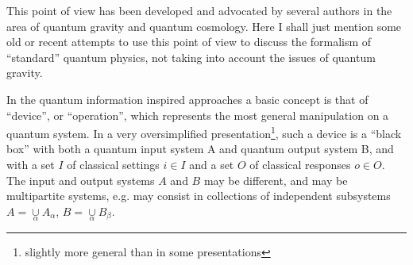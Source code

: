 This point of view has been developed and advocated by several authors in the area of quantum gravity and quantum cosmology. 
Here I shall just mention some old or recent attempts to use this point of view to discuss the formalism of ``standard'' quantum physics, not taking into account the issues of quantum gravity.

In the quantum information inspired approaches a basic concept is that of %
``device'', or ``operation'', which represents the most general manipulation on a quantum system. In a very oversimplified presentation\footnote{slightly more general than in some presentations}, such a device  is a ``black box'' with both a quantum input system A and  quantum output system B, and with a set $I$ of classical settings $i\in I$ and a set $O$ of classical responses $o\in O$. 
%
The input and output systems $A$ and $B$ may be different, and may be multipartite systems, e.g. may consist in collections of independent subsystems $A=\mathop\cup\limits_\alpha A_\alpha$, $B=\mathop\cup\limits_\alpha B_\beta$.

